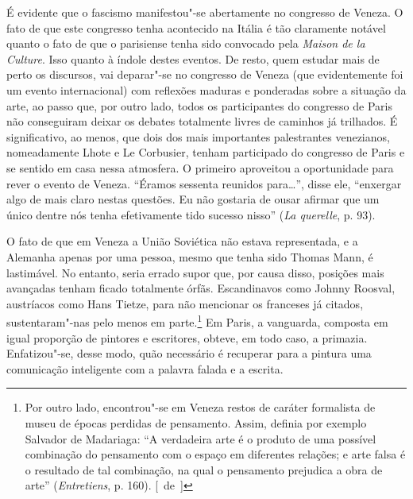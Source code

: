 É evidente que o fascismo manifestou"-se abertamente no congresso de
Veneza. O fato de que este congresso tenha acontecido na Itália é tão
claramente notável quanto o fato de que o parisiense tenha
sido convocado pela \emph{Maison de la Culture}. Isso quanto à índole
destes eventos. De resto, quem estudar mais de perto os
discursos, vai deparar"-se no congresso de Veneza (que evidentemente foi um
evento internacional) com reflexões maduras e ponderadas sobre a
situação da arte, ao passo que, por outro lado, todos
os participantes do congresso de Paris não conseguiram deixar os
debates totalmente livres de caminhos já trilhados. É significativo, ao
menos, que dois dos mais importantes palestrantes venezianos, nomeadamente Lhote e Le Corbusier, tenham
participado do congresso de Paris e se sentido em casa nessa atmosfera.
O primeiro aproveitou a oportunidade para
rever o evento de Veneza. ``Éramos sessenta reunidos
para\ldots{}'', disse ele, ``enxergar algo de mais claro nestas questões.
Eu não gostaria de ousar afirmar que um único dentre nós tenha
efetivamente tido sucesso nisso'' (\emph{La querelle}, p. 93).

O fato de que em Veneza a União Soviética não estava representada, e a
Alemanha apenas por uma pessoa, mesmo que tenha sido Thomas Mann, é
lastimável. No entanto, seria errado supor que, por causa disso,
posições mais avançadas tenham ficado totalmente órfãs. Escandinavos
como Johnny Roosval, austríacos como Hans Tietze, para não mencionar os
franceses já citados, sustentaram"-nas pelo menos em parte.\footnote{Por
  outro lado, encontrou"-se em Veneza restos de caráter formalista de
  museu de épocas perdidas de pensamento. Assim, definia por exemplo
  Salvador de Madariaga: ``A verdadeira arte é o produto de uma possível
  combinação do pensamento com o espaço em diferentes relações; e arte
  falsa é o resultado de tal combinação, na qual o pensamento prejudica
  a obra de arte'' (\emph{Entretiens}, p. 160). [~de~]} Em Paris, a vanguarda, composta
em igual proporção de pintores e escritores,
obteve, em todo caso, a primazia. Enfatizou"-se, desse modo, quão
necessário é recuperar para a pintura uma comunicação inteligente com a
palavra falada e a escrita.

